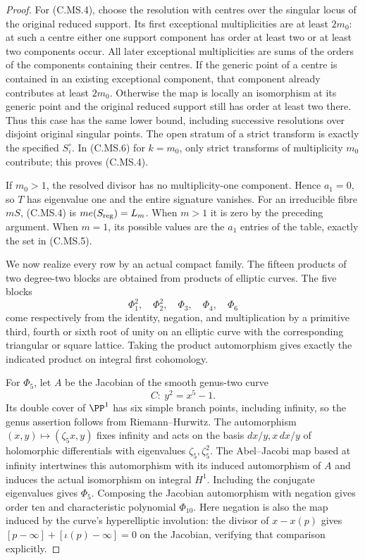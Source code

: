 \begin{proof}
For (C.MS.4), choose the resolution with centres
over the singular locus of the original reduced
support. Its first exceptional multiplicities
are at least $2m_0$: at such a centre either
one support component has order at least two
or at least two components occur. All later
exceptional multiplicities are sums of the
orders of the components containing their
centres. If the generic point of a centre is
contained in an existing exceptional component,
that component already contributes at least
$2m_0$. Otherwise the map is locally an
isomorphism at its generic point and the
original reduced support still has order at
least two there. Thus this case has the same
lower bound, including successive resolutions
over disjoint original singular points.
The open stratum of a strict
transform is exactly the specified
$S_i^\circ$. In (C.MS.6) for $k=m_0$, only
strict transforms of multiplicity $m_0$
contribute; this proves (C.MS.4).

If $m_0>1$, the resolved divisor has no
multiplicity-one component. Hence $a_1=0$,
so $T$ has eigenvalue one and the entire
signature vanishes. For an irreducible
fibre $mS$, (C.MS.4) is
$m e(S_{\rm reg})=L_m$. When $m>1$ it
is zero by the preceding argument. When
$m=1$, its possible values are the
$a_1$ entries of the table, exactly the
set in (C.MS.5).

We now realize every row by an actual compact
family. The fifteen products of two degree-two
blocks are obtained from products of elliptic
curves. The five blocks
\[
                 \Phi_1^2,\quad\Phi_2^2,\quad
                 \Phi_3,\quad\Phi_4,\quad\Phi_6
\]
come respectively from the identity, negation,
and multiplication by a primitive third, fourth
or sixth root of unity on an elliptic curve
with the corresponding triangular or square
lattice. Taking the product automorphism gives
exactly the indicated product on integral
first cohomology.

For $\Phi_5$, let $A$ be the Jacobian of
the smooth genus-two curve
\[
                           C:\ y^2=x^5-1.
\]
Its double cover of $\PP^1$ has six simple
branch points, including infinity, so the
genus assertion follows from Riemann--Hurwitz.
The automorphism $(x,y)\mapsto(\zeta_5x,y)$
fixes infinity and acts on the basis
$dx/y,x\,dx/y$ of holomorphic differentials
with eigenvalues $\zeta_5,\zeta_5^2$.
The Abel--Jacobi map based at infinity
intertwines this automorphism with its induced
automorphism of $A$ and induces the actual
isomorphism on integral $H^1$. Including the
conjugate eigenvalues gives $\Phi_5$.
Composing the Jacobian automorphism with
negation gives order ten and characteristic
polynomial $\Phi_{10}$. Here negation is also
the map induced by the curve's hyperelliptic
involution: the divisor of $x-x(p)$ gives
$[p-\infty]+[\iota(p)-\infty]=0$ on the
Jacobian, verifying that comparison explicitly.


\end{proof}
